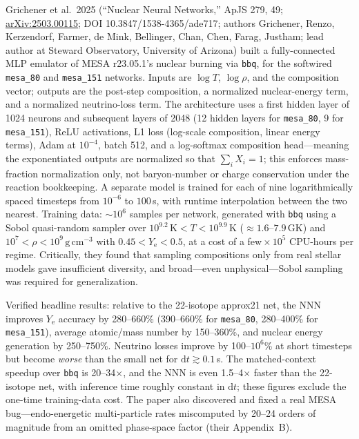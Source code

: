 \documentclass[11pt,a4paper]{article}
\newcommand{\Ye}{\ensuremath{Y_{\mathrm{e}}}}
\newcommand{\code}[1]{\texttt{#1}}
\newcommand{\arxiv}[1]{\href{https://arxiv.org/abs/#1}{arXiv:#1}}
\begin{document}
Grichener et al.\ 2025 (``Nuclear Neural Networks,'' ApJS 279, 49; \arxiv{2503.00115}; DOI 10.3847/1538-4365/ade717; authors Grichener, Renzo, Kerzendorf, Farmer, de Mink, Bellinger, Chan, Chen, Farag, Justham; lead author at Steward Observatory, University of Arizona) built a fully-connected MLP emulator of MESA r23.05.1's nuclear burning via \code{bbq}, for the softwired \code{mesa\_80} and \code{mesa\_151} networks. Inputs are $\log T$, $\log\rho$, and the composition vector; outputs are the post-step composition, a normalized nuclear-energy term, and a normalized neutrino-loss term. The architecture uses a first hidden layer of 1024 neurons and subsequent layers of 2048 (12 hidden layers for \code{mesa\_80}, 9 for \code{mesa\_151}), ReLU activations, L1 loss (log-scale composition, linear energy terms), Adam at $10^{-4}$, batch 512, and a log-softmax composition head---meaning the exponentiated outputs are normalized so that $\sum_i X_i = 1$; this enforces mass-fraction normalization only, not baryon-number or charge conservation under the reaction bookkeeping. A separate model is trained for each of nine logarithmically spaced timesteps from $10^{-6}$ to $100$\,s, with runtime interpolation between the two nearest. Training data: ${\sim}10^{6}$ samples per network, generated with \code{bbq} using a Sobol quasi-random sampler over $10^{9.2}\,\mathrm{K} < T < 10^{9.9}\,\mathrm{K}$ (${\approx}1.6$--$7.9$\,GK) and $10^{7} < \rho < 10^{9}\,\mathrm{g\,cm^{-3}}$ with $0.45 < \Ye < 0.5$, at a cost of a few${}\times10^{5}$ CPU-hours per regime. Critically, they found that sampling compositions only from real stellar models gave insufficient diversity, and broad---even unphysical---Sobol sampling was required for generalization.

Verified headline results: relative to the 22-isotope approx21 net, the NNN improves \Ye{} accuracy by 280--660\% (390--660\% for \code{mesa\_80}, 280--400\% for \code{mesa\_151}), average atomic/mass number by 150--360\%, and nuclear energy generation by 250--750\%. Neutrino losses improve by 100--$10^{6}$\% at short timesteps but become \emph{worse} than the small net for $\mathrm{d}t \gtrsim 0.1$\,s. The matched-context speedup over \code{bbq} is 20--34$\times$, and the NNN is even 1.5--4$\times$ faster than the 22-isotope net, with inference time roughly constant in $\mathrm{d}t$; these figures exclude the one-time training-data cost. The paper also discovered and fixed a real MESA bug---endo-energetic multi-particle rates miscomputed by 20--24 orders of magnitude from an omitted phase-space factor (their Appendix~B).
\end{document}
